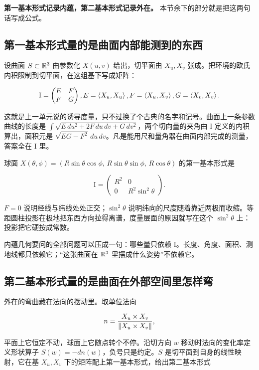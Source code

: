 \textbf{第一基本形式记录内蕴，第二基本形式记录外在。} 本节余下的部分就是把这两句话写成公式。

\subsection{第一基本形式量的是曲面内部能测到的东西}

设曲面 \(S\subset\mathbb{R}^{3}\) 由参数化 \(X(u,v)\) 给出，切平面由 \(X_{u},X_{v}\) 张成。把环境的欧氏内积限制到切平面，在这组基下写成矩阵：

\[
\mathrm{I}=\begin{pmatrix}E&F\\F&G\end{pmatrix},
\space
E=\left\langle X_{u},X_{u}\right\rangle,\space
F=\left\langle X_{u},X_{v}\right\rangle,\space
G=\left\langle X_{v},X_{v}\right\rangle.
\]

这就是上一单元说的诱导度量，只不过换了个古典的名字和记号。曲面上一条参数曲线的长度是 \(\int\sqrt{E\,du^{2}+2F\,du\,dv+G\,dv^{2}}\)，两个切向量的夹角由 \(\mathrm{I}\) 定义的内积算出，面积元是 \(\sqrt{EG-F^{2}}\,du\,dv\)。凡是能用尺和量角器在曲面内部完成的测量，答案全在 \(\mathrm{I}\) 里。

球面 \(X(\theta,\phi)=(R\sin\theta\cos\phi,\,R\sin\theta\sin\phi,\,R\cos\theta)\) 的第一基本形式是

\[
\mathrm{I}=\begin{pmatrix}R^{2}&0\\0&R^{2}\sin^{2}\theta\end{pmatrix}.
\]

\(F=0\) 说明经线与纬线处处正交；\(\sin^{2}\theta\) 说明纬向的尺度随着靠近两极而收缩。等距圆柱投影在极地把东西方向拉得离谱，度量层面的原因就写在这个 \(\sin^{2}\theta\) 上：投影把它硬按成常数。

内蕴几何要问的全部问题可以压成一句：哪些量只依赖 \(\mathrm{I}\)。长度、角度、面积、测地线都只依赖它；``这张曲面在 \(\mathbb{R}^{3}\) 里摆成什么姿势''不依赖它。

\subsection{第二基本形式量的是曲面在外部空间里怎样弯}

外在的弯曲藏在法向的摆动里。取单位法向

\[
n=\frac{X_{u}\times X_{v}}{\left\lVert X_{u}\times X_{v}\right\rVert},
\]

平面上它恒定不动，球面上它随点转个不停。沿切方向 \(w\) 移动时法向的变化率定义形状算子 \(S(w)=-dn(w)\)，负号只是约定。\(S\) 是切平面到自身的线性映射，它在基 \(X_{u},X_{v}\) 下的矩阵配上第一基本形式，给出第二基本形式

